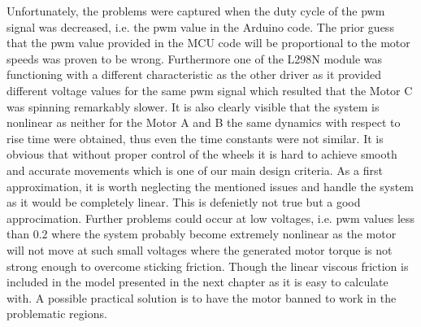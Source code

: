 \documentclass[12pt,english,twoside]{article}
\begin{document}
Unfortunately, the problems were captured when the duty cycle of the pwm signal was decreased, i.e. the pwm value in the Arduino code. The prior guess that the pwm value provided in the MCU code will be proportional to the motor speeds was proven to be wrong. Furthermore one of the L298N module was functioning with a different characteristic as the other driver as it provided different voltage values for the same pwm signal which resulted that the Motor C was spinning remarkably slower. It is also clearly visible that the system is nonlinear as neither for the Motor A and B the same dynamics with respect to rise time were obtained, thus even the time constants were not similar.
It is obvious that without proper control of the wheels it is hard to achieve smooth and accurate movements which is one of our main design criteria. As a first approximation, it is worth neglecting the mentioned issues and handle the system as it would be completely linear. This is defenietly not true but a good approcimation. Further problems could occur at low voltages, i.e. pwm values less than 0.2 where the system probably become extremely nonlinear as the motor will not move at such small voltages where the generated motor torque is not strong enough to overcome sticking friction. Though the linear viscous friction is included in the model presented in the next chapter as it is easy to calculate with. A possible practical solution is to have the motor banned to work in the problematic regions. 
\newpage
\end{document}
